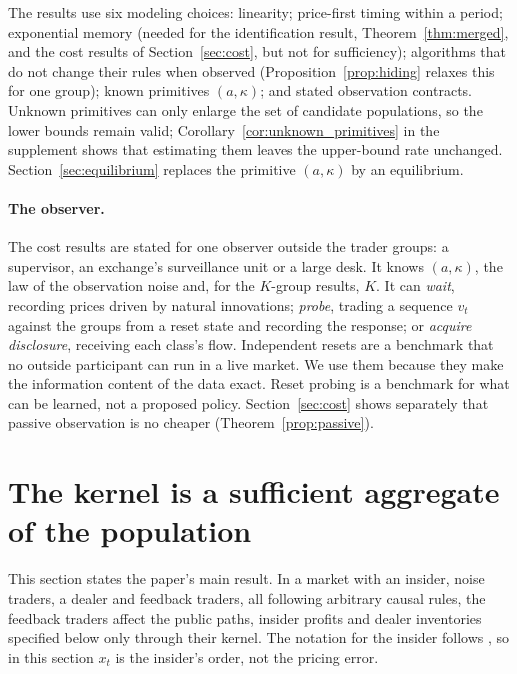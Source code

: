 \documentclass[12pt]{article}
\theoremstyle{definition}
\theoremstyle{remark}
\begin{document}
The results use six modeling choices: linearity; price-first timing within a period; exponential memory (needed for the identification result, Theorem~\ref{thm:merged}, and the cost results of Section~\ref{sec:cost}, but not for sufficiency); algorithms that do not change their rules when observed (Proposition~\ref{prop:hiding} relaxes this for one group); known primitives $(a,\kappa)$; and stated observation contracts. Unknown primitives can only enlarge the set of candidate populations, so the lower bounds remain valid; Corollary~\ref{cor:unknown_primitives} in the supplement shows that estimating them leaves the upper-bound rate unchanged. Section~\ref{sec:equilibrium} replaces the primitive $(a,\kappa)$ by an equilibrium.

\paragraph{The observer.} The cost results are stated for one observer outside the trader groups: a supervisor, an exchange's surveillance unit or a large desk. It knows $(a,\kappa)$, the law of the observation noise and, for the $K$-group results, $K$. It can \emph{wait}, recording prices driven by natural innovations; \emph{probe}, trading a sequence $v_t$ against the groups from a reset state and recording the response; or \emph{acquire disclosure}, receiving each class's flow. Independent resets are a benchmark that no outside participant can run in a live market. We use them because they make the information content of the data exact. Reset probing is a benchmark for what can be learned, not a proposed policy. Section~\ref{sec:cost} shows separately that passive observation is no cheaper (Theorem~\ref{prop:passive}).

\section{The kernel is a sufficient aggregate of the population}\label{sec:suff}

This section states the paper's main result. In a market with an insider, noise traders, a dealer and feedback traders, all following arbitrary causal rules, the feedback traders affect the public paths, insider profits and dealer inventories specified below only through their kernel. The notation for the insider follows \citet{kyle1985}, so in this section $x_t$ is the insider's order, not the pricing error.
\end{document}
